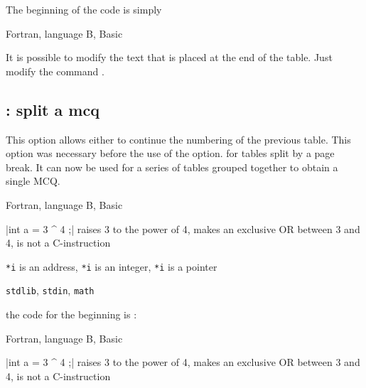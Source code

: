The beginning of the code is simply

\begin{tkzltxexample}[small]
  \begin{alterqcm}[lq=80mm,long]
  {{Fortran},
   {language B},
   {Basic}}
  \end{alterqcm}
\end{tkzltxexample}

\medskip
It is possible to modify the text that is placed at the end of the table. Just modify the command .

\begin{tkzltxexample}[small]
 \def\aqfoottext{continued on next page\ldots}
\end{tkzltxexample}

\subsection{ : split a mcq }
This option allows either to continue the numbering of the previous table.
This option was necessary before the use of the  option.
 for tables split by a page break. It can now be used
  for a series of tables grouped together to obtain a single MCQ.

\begin{alterqcm}[lq=80mm,title=false,num=false,long]
  {{Fortran},
   {language B},
   {Basic}}

\verbdef\argprop|int a = 3 ^ 4 ;|
\AQquestion{\argprop}
  {{raises 3 to the power of 4},
   {makes an exclusive OR between 3 and 4},
   {is not a C-instruction}}
\end{alterqcm}

\begin{alterqcm}[lq=80mm,title=false,num=false,numbreak=2,long]
{{\texttt{*i} is an address},
 {\texttt{*i} is an integer},
 {\texttt{*i} is a pointer}}

{{\texttt{stdlib}},
 {\texttt{stdin}},
 {\texttt{math}}}
\end{alterqcm}

the code for the beginning is :

\begin{tkzltxexample}[small]
  \begin{alterqcm}[lq=80mm,title=false,num=false,long]
  {{Fortran},
   {language B},
   {Basic}}

  \verbdef\argprop|int a = 3 ^ 4 ;|
  \AQquestion{\argprop}
  {{raises 3 to the power of 4},
   {makes an exclusive OR between 3 and 4},
   {is not a C-instruction}}
  \end{alterqcm}
\end{tkzltxexample}

